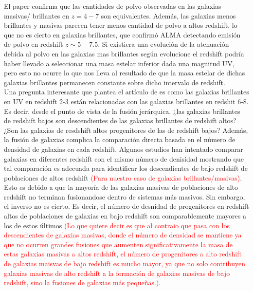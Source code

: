 \documentclass{article}
\begin{document}
El paper \cite{finkelstein2015increasing} confirma que las cantidades de polvo observadas en las galaxias masivas/ brillantes en $z=4-7$ son equivalentes. Además, las galaxias menos brillantes y masivas parecen tener menos cantidad de polvo a altos redshift, lo que no es cierto en galaxias brillantes, que confirmó ALMA detectando emisión de polvo en redshift $z\sim 5-7.5$. Si existiera una evolución de la atenuación debida al polvo en las galaxias mas brillantes según evolucione el redshift  podría haber llevado a seleccionar una masa estelar inferior dada una magnitud UV, pero esto no ocurre lo que nos lleva al resultado de que la masa estelar de dichas galaxias brillantes permanecen constante sobre dicho intervalo de redshift. \\

Una pregunta interesante que plantea el artículo de \cite{finkelstein2015increasing} es como las galaxias brillantes en UV en redshift 2-3 están relacionadas con las galaxias brillantes en redshit 6-8. Es decir, desde el punto de vista de la fusión jerárquica, ¿las galaxias brillantes de redshift bajos son descendientes de las galaxias brillantes de redshift altos? ¿Son las galaxias de resdshift altos progenitores de las de redshift bajos? Además, la fusión de galaxias complica la comparación directa basada en el número de densidad de galaxias en cada redshift. Algunos estudios han intentado comparar galaxias en diferentes redshift con el mismo número de denisidad mostrando que tal comparación es adecuada para identificar los descendientes de bajo redshift de poblaciones de altos redshift \textcolor{red}{(Para nuestro caso de galaxias brillantes/masivas)}. Esto es debido a que la mayoría de las galaxias masivas de poblaciones de alto redshift no terminan fusionandose dentro de sistemas más masivos. Sin embargo, el inverso no es cierto. Es decir, el número de desnidad de progenitores en redshift altos de poblaciones de galaxias en bajo redshift son comparablemente mayores a los de estos últimos \textcolor{red}{(Lo que quiere decir es que al contraio que pasa con los descendientes de galaxias masivas, donde el número de densidad se mantiene ya que no ocurren grandes fusiones que aumenten significativamente la masa de estas galaxias masivas a altos redshift, el número de progenitores a alto redshift de galaxias maisvas de bajo redshift es mucho mayor, ya que no solo contribuyen galaxias masivas de alto redshift a la formación de galaxias masivas de bajo redshift, sino la fusiones de galaxias más pequeñas.)}.\\
\end{document}
